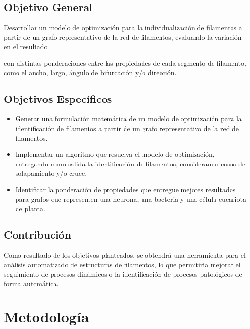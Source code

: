 \documentclass{article}
\begin{document}
\subsection{Objetivo General}
Desarrollar un modelo de optimizaci\'on para la individualizaci\'on de filamentos a partir de un grafo representativo de la red de filamentos, evaluando la variaci\'on en el resultado 


con distintas ponderaciones entre las propiedades de cada segmento de filamento, como el ancho, largo, \'angulo de bifurcaci\'on y/o direcci\'on.

\subsection{Objetivos Espec\'ificos}
\begin{itemize}
    \item Generar una formulaci\'on matem\'atica de un modelo de optimizaci\'on para la identificaci\'on de filamentos a partir de un grafo representativo de la red de filamentos. 
    \item Implementar un algoritmo que resuelva el modelo de optimizaci\'on, entregando como salida la identificaci\'on de filamentos, considerando casos de solapamiento y/o cruce.
    \item Identificar la ponderaci\'on de propiedades que entregue mejores resultados para grafos que representen una neurona, una bacteria y una c\'elula eucariota de planta. 
    
\end{itemize}

\subsection{Contribuci\'on}

Como resultado de los objetivos planteados, se obtendr\'a una herramienta para el an\'alisis automatizado de estructuras de filamentos, lo que permitir\'ia mejorar el seguimiento de procesos din\'amicos o la identificaci\'on de procesos patol\'ogicos de forma autom\'atica.

\section{Metodolog\'ia}
\end{document}
